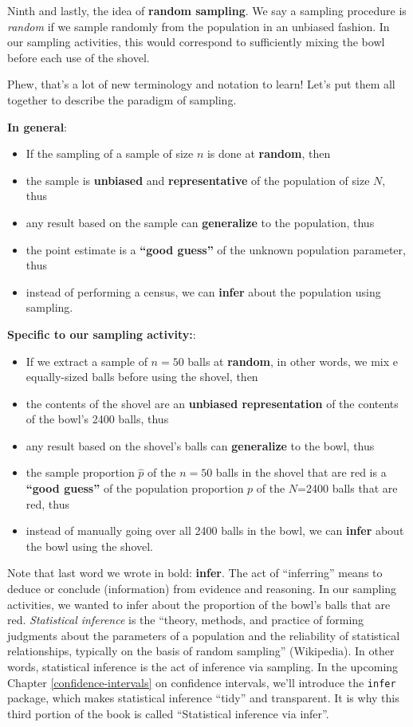 \documentclass[
]{book}
\providecommand{\tightlist}{%
  \setlength{\itemsep}{0pt}\setlength{\parskip}{0pt}}
\begin{document}
Ninth and lastly, the idea of \textbf{random sampling}. We say a sampling procedure is \emph{random} if we sample randomly from the population in an unbiased fashion. In our sampling activities, this would correspond to sufficiently mixing the bowl before each use of the shovel.

Phew, that's a lot of new terminology and notation to learn! Let's put them all together to describe the paradigm of sampling.

\textbf{In general}:

\begin{itemize}
\tightlist
\item
  If the sampling of a sample of size \(n\) is done at \textbf{random}, then
\item
  the sample is \textbf{unbiased} and \textbf{representative} of the population of size \(N\), thus
\item
  any result based on the sample can \textbf{generalize} to the population, thus
\item
  the point estimate is a \textbf{``good guess''} of the unknown population parameter, thus
\item
  instead of performing a census, we can \textbf{infer} about the population using sampling.
\end{itemize}

\textbf{Specific to our sampling activity:}:

\begin{itemize}
\tightlist
\item
  If we extract a sample of \(n=50\) balls at \textbf{random}, in other words, we mix e equally-sized balls before using the shovel, then
\item
  the contents of the shovel are an \textbf{unbiased representation} of the contents of the bowl's 2400 balls, thus
\item
  any result based on the shovel's balls can \textbf{generalize} to the bowl, thus
\item
  the sample proportion \(\widehat{p}\) of the \(n=50\) balls in the shovel that are red is a \textbf{``good guess''} of the population proportion \(p\) of the \(N\)=2400 balls that are red, thus
\item
  instead of manually going over all 2400 balls in the bowl, we can \textbf{infer} about the bowl using the shovel.
\end{itemize}

Note that last word we wrote in bold: \textbf{infer}. The act of ``inferring'' means to deduce or conclude (information) from evidence and reasoning. In our sampling activities, we wanted to infer about the proportion of the bowl's balls that are red. \emph{Statistical inference} is the ``theory, methods, and practice of forming judgments about the parameters of a population and the reliability of statistical relationships, typically on the basis of random sampling'' (Wikipedia). In other words, statistical inference is the act of inference via sampling. In the upcoming Chapter \ref{confidence-intervals} on confidence intervals, we'll introduce the \texttt{infer} package, which makes statistical inference ``tidy'' and transparent. It is why this third portion of the book is called ``Statistical inference via infer''.
\end{document}
